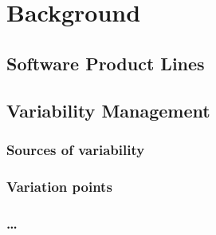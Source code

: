 \chapter{Background}

\section{Software Product Lines}
\section{Variability Management}
\subsection{Sources of variability}
\subsection{Variation points}
\subsection{\ldots}